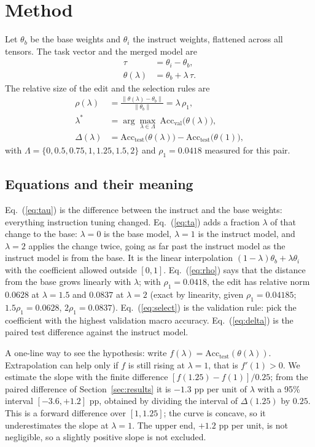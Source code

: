 \documentclass[conference]{IEEEtran}
\begin{document}
\section{Method}
Let $\theta_b$ be the base weights and $\theta_i$ the instruct weights, flattened across all tensors. The task vector and the merged model are
\begin{align}
\tau &= \theta_i-\theta_b, \label{eq:tau}\\
\theta(\lambda) &= \theta_b+\lambda\,\tau. \label{eq:ta}
\end{align}
The relative size of the edit and the selection rules are
\begin{align}
\rho(\lambda) &= \frac{\lVert\theta(\lambda)-\theta_b\rVert}{\lVert\theta_b\rVert}=\lambda\,\rho_1, \label{eq:rho}\\
\lambda^\ast &= \arg\max_{\lambda\in\Lambda}\ \mathrm{Acc}_{\mathrm{val}}\big(\theta(\lambda)\big), \label{eq:select}\\
\Delta(\lambda) &= \mathrm{Acc}_{\mathrm{test}}\big(\theta(\lambda)\big)-\mathrm{Acc}_{\mathrm{test}}\big(\theta(1)\big), \label{eq:delta}
\end{align}
with $\Lambda=\{0,0.5,0.75,1,1.25,1.5,2\}$ and $\rho_1=0.0418$ measured for this pair.

\subsection*{Equations and their meaning}
Eq.~(\ref{eq:tau}) is the difference between the instruct and the base weights: everything instruction tuning changed. Eq.~(\ref{eq:ta}) adds a fraction $\lambda$ of that change to the base: $\lambda=0$ is the base model, $\lambda=1$ is the instruct model, and $\lambda=2$ applies the change twice, going as far past the instruct model as the instruct model is from the base. It is the linear interpolation $(1-\lambda)\theta_b+\lambda\theta_i$ with the coefficient allowed outside $[0,1]$. Eq.~(\ref{eq:rho}) says that the distance from the base grows linearly with $\lambda$; with $\rho_1=0.0418$, the edit has relative norm $0.0628$ at $\lambda=1.5$ and $0.0837$ at $\lambda=2$ (exact by linearity, given $\rho_1=0.04185$; $1.5\rho_1=0.0628$, $2\rho_1=0.0837$). Eq.~(\ref{eq:select}) is the validation rule: pick the coefficient with the highest validation macro accuracy. Eq.~(\ref{eq:delta}) is the paired test difference against the instruct model.

A one-line way to see the hypothesis: write $f(\lambda)=\mathrm{Acc}_{\mathrm{test}}(\theta(\lambda))$. Extrapolation can help only if $f$ is still rising at $\lambda=1$, that is $f'(1)>0$. We estimate the slope with the finite difference $[f(1.25)-f(1)]/0.25$; from the paired difference of Section~\ref{sec:results} it is $-1.3$ pp per unit of $\lambda$ with a 95\% interval $[-3.6,+1.2]$ pp, obtained by dividing the interval of $\Delta(1.25)$ by $0.25$. This is a forward difference over $[1,1.25]$; the curve is concave, so it underestimates the slope at $\lambda=1$. The upper end, $+1.2$ pp per unit, is not negligible, so a slightly positive slope is not excluded.
\end{document}
